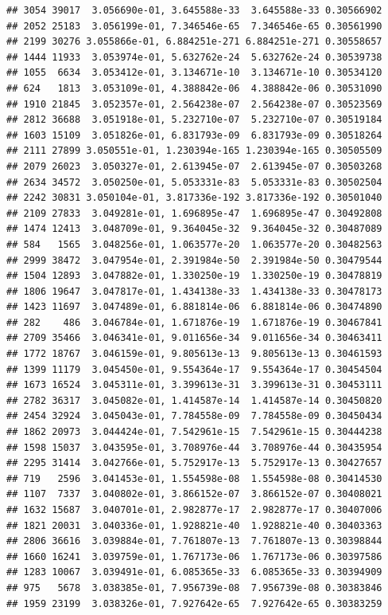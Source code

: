 \documentclass[
]{article}
\begin{document}
\begin{verbatim}
## 3054 39017  3.056690e-01, 3.645588e-33  3.645588e-33 0.30566902
## 2052 25183  3.056199e-01, 7.346546e-65  7.346546e-65 0.30561990
## 2199 30276 3.055866e-01, 6.884251e-271 6.884251e-271 0.30558657
## 1444 11933  3.053974e-01, 5.632762e-24  5.632762e-24 0.30539738
## 1055  6634  3.053412e-01, 3.134671e-10  3.134671e-10 0.30534120
## 624   1813  3.053109e-01, 4.388842e-06  4.388842e-06 0.30531090
## 1910 21845  3.052357e-01, 2.564238e-07  2.564238e-07 0.30523569
## 2812 36688  3.051918e-01, 5.232710e-07  5.232710e-07 0.30519184
## 1603 15109  3.051826e-01, 6.831793e-09  6.831793e-09 0.30518264
## 2111 27899 3.050551e-01, 1.230394e-165 1.230394e-165 0.30505509
## 2079 26023  3.050327e-01, 2.613945e-07  2.613945e-07 0.30503268
## 2634 34572  3.050250e-01, 5.053331e-83  5.053331e-83 0.30502504
## 2242 30831 3.050104e-01, 3.817336e-192 3.817336e-192 0.30501040
## 2109 27833  3.049281e-01, 1.696895e-47  1.696895e-47 0.30492808
## 1474 12413  3.048709e-01, 9.364045e-32  9.364045e-32 0.30487089
## 584   1565  3.048256e-01, 1.063577e-20  1.063577e-20 0.30482563
## 2999 38472  3.047954e-01, 2.391984e-50  2.391984e-50 0.30479544
## 1504 12893  3.047882e-01, 1.330250e-19  1.330250e-19 0.30478819
## 1806 19647  3.047817e-01, 1.434138e-33  1.434138e-33 0.30478173
## 1423 11697  3.047489e-01, 6.881814e-06  6.881814e-06 0.30474890
## 282    486  3.046784e-01, 1.671876e-19  1.671876e-19 0.30467841
## 2709 35466  3.046341e-01, 9.011656e-34  9.011656e-34 0.30463411
## 1772 18767  3.046159e-01, 9.805613e-13  9.805613e-13 0.30461593
## 1399 11179  3.045450e-01, 9.554364e-17  9.554364e-17 0.30454504
## 1673 16524  3.045311e-01, 3.399613e-31  3.399613e-31 0.30453111
## 2782 36317  3.045082e-01, 1.414587e-14  1.414587e-14 0.30450820
## 2454 32924  3.045043e-01, 7.784558e-09  7.784558e-09 0.30450434
## 1862 20973  3.044424e-01, 7.542961e-15  7.542961e-15 0.30444238
## 1598 15037  3.043595e-01, 3.708976e-44  3.708976e-44 0.30435954
## 2295 31414  3.042766e-01, 5.752917e-13  5.752917e-13 0.30427657
## 719   2596  3.041453e-01, 1.554598e-08  1.554598e-08 0.30414530
## 1107  7337  3.040802e-01, 3.866152e-07  3.866152e-07 0.30408021
## 1632 15687  3.040701e-01, 2.982877e-17  2.982877e-17 0.30407006
## 1821 20031  3.040336e-01, 1.928821e-40  1.928821e-40 0.30403363
## 2806 36616  3.039884e-01, 7.761807e-13  7.761807e-13 0.30398844
## 1660 16241  3.039759e-01, 1.767173e-06  1.767173e-06 0.30397586
## 1283 10067  3.039491e-01, 6.085365e-33  6.085365e-33 0.30394909
## 975   5678  3.038385e-01, 7.956739e-08  7.956739e-08 0.30383846
## 1959 23199  3.038326e-01, 7.927642e-65  7.927642e-65 0.30383259

\end{verbatim}
\end{document}
